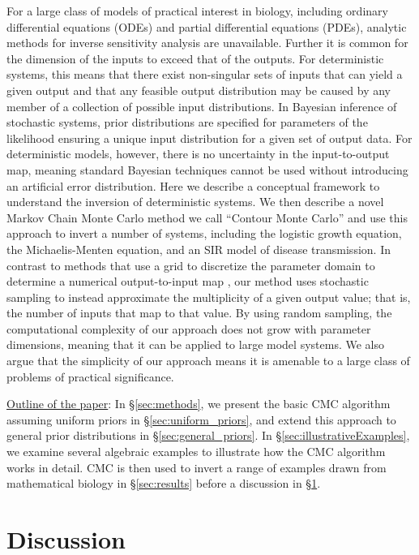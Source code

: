\documentclass[10pt,letterpaper]{article}
\begin{document}
For a large class of models of practical interest in biology, including ordinary differential equations (ODEs) and partial differential equations (PDEs), analytic methods for inverse sensitivity analysis  are unavailable. Further it is common for the dimension of the inputs to exceed that of the outputs. For deterministic systems, this means that there exist non-singular sets of inputs that can yield a given output and that any feasible output distribution may be caused by any member of a collection of possible input distributions. In Bayesian inference of stochastic systems, prior distributions are specified for parameters of the likelihood ensuring a unique input distribution for a given set of output data. For deterministic models, however, there is no uncertainty in the input-to-output map, meaning standard Bayesian techniques cannot be used without introducing an artificial error distribution. Here we describe a conceptual framework to understand the inversion of deterministic systems. We then describe a novel Markov Chain Monte Carlo method we call ``Contour Monte Carlo'' and use this approach to invert a number of systems, including the logistic growth equation, the Michaelis-Menten equation, and an SIR model of disease transmission. In contrast to methods that use a grid to discretize the parameter domain to determine a numerical output-to-input map \cite{butler2014measure}, our method uses stochastic sampling to instead approximate the multiplicity of a given output value; that is, the number of inputs that map to that value. By using random sampling, the computational complexity of our approach does not grow with parameter dimensions, meaning that it can be applied to large model systems. We also argue that the simplicity of our approach means it is amenable to a large class of problems of practical significance.


\bigskip
\noindent\underline{Outline of the paper}: In \S \ref{sec:methods}, we present the basic CMC algorithm assuming uniform priors in \S \ref{sec:uniform_priors}, and extend this approach to general prior distributions in \S \ref{sec:general_priors}. In \S \ref{sec:illustrativeExamples}, we examine several algebraic examples to illustrate how the CMC algorithm works in detail. CMC is then used to invert a range of examples drawn from mathematical biology in \S \ref{sec:results} before a discussion in \S \ref{sec:discussion}.



\section{Discussion}
\label{sec:discussion}
\end{document}
